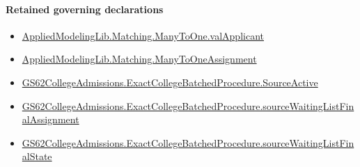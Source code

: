 \documentclass[10pt]{article}
\begin{document}
\paragraph{Retained governing declarations}
\begin{itemize}\raggedright
\item \hyperlink{governing-declaration-8545f3e969a7bb0c}{Applied\allowbreak{}Modeling\allowbreak{}Lib.\allowbreak{}Matching.\allowbreak{}Many\allowbreak{}To\allowbreak{}One.\allowbreak{}val\allowbreak{}Applicant}
\item \hyperlink{governing-declaration-5f205dc5e20311a8}{Applied\allowbreak{}Modeling\allowbreak{}Lib.\allowbreak{}Matching.\allowbreak{}Many\allowbreak{}To\allowbreak{}One\allowbreak{}Assignment}
\item \hyperlink{governing-declaration-65e4bdbeef377fb1}{GS62\allowbreak{}College\allowbreak{}Admissions.\allowbreak{}Exact\allowbreak{}College\allowbreak{}Batched\allowbreak{}Procedure.\allowbreak{}Source\allowbreak{}Active}
\item \hyperlink{paper-prerequisite-4b230c4877bf6ef9}{GS62\allowbreak{}College\allowbreak{}Admissions.\allowbreak{}Exact\allowbreak{}College\allowbreak{}Batched\allowbreak{}Procedure.\allowbreak{}source\allowbreak{}Waiting\allowbreak{}List\allowbreak{}Final\allowbreak{}Assignment}
\item \hyperlink{paper-prerequisite-6b7d3de7046692a6}{GS62\allowbreak{}College\allowbreak{}Admissions.\allowbreak{}Exact\allowbreak{}College\allowbreak{}Batched\allowbreak{}Procedure.\allowbreak{}source\allowbreak{}Waiting\allowbreak{}List\allowbreak{}Final\allowbreak{}State}
\end{itemize}
\end{document}

